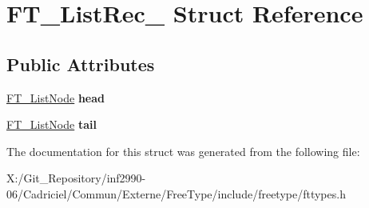 \hypertarget{struct_f_t___list_rec__}{\section{F\-T\-\_\-\-List\-Rec\-\_\- Struct Reference}
\label{struct_f_t___list_rec__}
}
\subsection*{Public Attributes}
\begin{DoxyCompactItemize}
\item 
\hypertarget{struct_f_t___list_rec___a09ed35c2bcdc1c3acd12ff4650dfdeb9}{\hyperlink{struct_f_t___list_node_rec__}{F\-T\-\_\-\-List\-Node} {\bfseries head}}\label{struct_f_t___list_rec___a09ed35c2bcdc1c3acd12ff4650dfdeb9}

\item 
\hypertarget{struct_f_t___list_rec___a4664761f0ab2af3d48231b00cd978b23}{\hyperlink{struct_f_t___list_node_rec__}{F\-T\-\_\-\-List\-Node} {\bfseries tail}}\label{struct_f_t___list_rec___a4664761f0ab2af3d48231b00cd978b23}

\end{DoxyCompactItemize}


The documentation for this struct was generated from the following file\-:\begin{DoxyCompactItemize}
\item 
X\-:/\-Git\-\_\-\-Repository/inf2990-\/06/\-Cadriciel/\-Commun/\-Externe/\-Free\-Type/include/freetype/fttypes.\-h\end{DoxyCompactItemize}
